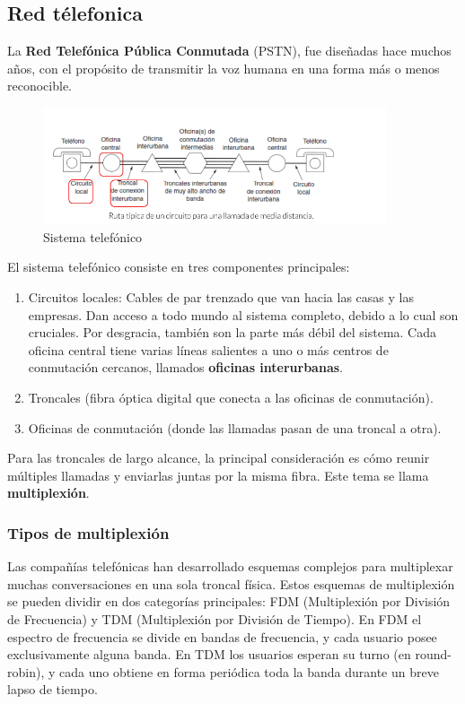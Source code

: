 \subsection{Red télefonica}
La \textbf{Red Telefónica Pública Conmutada} (PSTN), fue diseñadas hace muchos años, con el propósito de transmitir la voz humana en una forma más o menos reconocible.

\begin{figure}[H]
	\centering
	\includegraphics[width=0.9\textwidth
]{images/redes-telefonicas.png}
	\caption[Sistema  telefónico]{Sistema  telefónico}
	\label{fig:sistema-telefonico}
\end{figure}

El sistema telefónico consiste en tres componentes principales:
\begin{enumerate}
  \item Circuitos locales: Cables de par trenzado que van hacia las casas y las empresas. Dan acceso a todo mundo al sistema completo, debido a lo cual son cruciales. Por desgracia, también son la parte más débil del sistema. Cada oficina central tiene varias líneas salientes a uno o más centros de conmutación cercanos, llamados \textbf{oficinas interurbanas}.
  \item Troncales (fibra óptica digital que conecta a las oficinas de conmutación).
  \item Oficinas de conmutación (donde las llamadas pasan de una troncal a otra).
\end{enumerate}

Para las troncales de largo alcance, la principal consideración es cómo reunir múltiples llamadas y
enviarlas juntas por la misma fibra. Este tema se llama \textbf{multiplexión}.

\subsubsection{Tipos de multiplexión}
Las compañías telefónicas han desarrollado esquemas complejos para multiplexar muchas conversaciones en una sola troncal física. Estos esquemas de multiplexión se pueden dividir en dos categorías principales: FDM (Multiplexión por División de Frecuencia) y TDM (Multiplexión por División de Tiempo). En FDM el espectro de frecuencia se divide en bandas de frecuencia, y cada usuario posee exclusivamente alguna banda. En TDM los usuarios esperan su turno (en round-robin), y cada uno obtiene en forma periódica toda la banda durante un breve lapso de tiempo.

